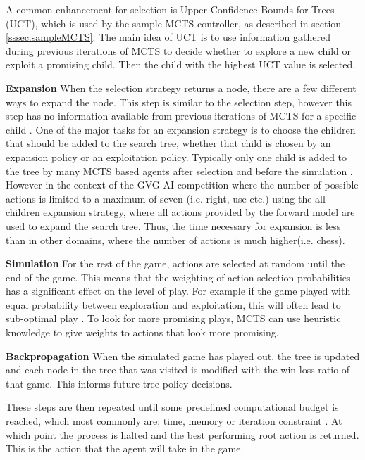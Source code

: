 \documentclass[journal]{IEEEtran}
\begin{document}
			A common enhancement for selection is Upper Confidence Bounds for Trees (UCT), which is used by the sample MCTS controller, as described in section \ref{sssec:sampleMCTS}. 
			The main idea of UCT is to use information gathered during previous iterations of MCTS to decide whether to explore a new child or exploit a promising child. Then the child with the highest UCT value is selected.
		
		\textbf{Expansion}
			When the selection strategy returns a node, there are a few different ways to expand the node. This step is similar to the selection step, however this step has no information available from previous iterations of MCTS for a specific child \cite{schuster2015mcts}. 
			One of the major tasks for an expansion strategy is to choose the children that should be added to the search tree, whether that child is chosen by an expansion policy or an exploitation policy.
			Typically only one child is added to the tree by many MCTS based agents after selection and before the simulation \cite{chaslot2008monte, schuster2015mcts}. However in the context of the GVG-AI competition where the number of possible actions is limited to a maximum of seven (i.e. right, use etc.) using the all children expansion strategy, where all actions provided by the forward model are used to expand the search tree. Thus, the time necessary for expansion is less than in other domains, where the number of actions is much higher(i.e. chess).
			

		\textbf{Simulation}
			For the rest of the game, actions are selected at random until the end of the game. This means that the weighting of action selection probabilities has a significant effect on the level of play. For example if the game played with equal probability between exploration and exploitation, this will often lead to sub-optimal play \cite{chaslot2008monte}. To look for more promising plays, MCTS can use heuristic knowledge to give weights to actions that look more promising.

		\textbf{Backpropagation}
			When the simulated game has played out, the tree is updated and each node in the tree that was visited is modified with the win loss ratio of that game. This informs future tree policy decisions.
			
			These steps are then repeated until some predefined computational budget is reached, which most commonly are; time, memory or iteration constraint \cite{browne2012survey}. At which point the process is halted and the best performing root action is returned. This is the action that the agent will take in the game.
\end{document}
